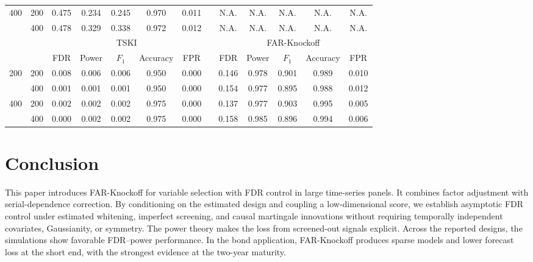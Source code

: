﻿\documentclass[12pt]{article}
\newcommand{\0}{\mbox{\bf 0}}
\theoremstyle{plain}%
\theoremstyle{definition}
\begin{document}
{\begin{table}[htbp]
{\begin{tabular}{ccccccccccccc}
		400   & 200   & 0.475  & 0.234  & 0.245  & 0.970  & 0.011  &       & N.A.  & N.A.  & N.A.  & N.A.  & N.A.  \\
		& 400   & 0.478  & 0.329  & 0.338  & 0.972  & 0.012  &       & N.A.  & N.A.  & N.A.  & N.A.  & N.A.  \\
		&       & \multicolumn{5}{c}{TSKI}              &       & \multicolumn{5}{c}{FAR-Knockoff} \\
		\cmidrule{3-7}\cmidrule{9-13}          &       & FDR & Power & $F_{1}$ & Accuracy & FPR   &       & FDR & Power & $F_{1}$ & Accuracy & FPR \\
		200   & 200   & 0.008  & 0.006  & 0.006  & 0.950  & 0.000  &       & 0.146 & 0.978 & 0.901 & 0.989 & 0.010 \\

		& 400   & 0.001  & 0.001  & 0.001  & 0.950  & 0.000  &       & 0.154 & 0.977 & 0.895 & 0.988 & 0.012 \\

		400   & 200   & 0.002  & 0.002  & 0.002  & 0.975  & 0.000  &       & 0.137 & 0.977 & 0.903 & 0.995 & 0.005 \\

		& 400   & 0.000  & 0.002  & 0.002  & 0.975  & 0.000  &       & 0.158 & 0.985 & 0.896 & 0.994 & 0.006 \\

		\bottomrule
	\end{tabular}}
\end{table}
\fi




\section{Conclusion}
\label{sec:conclusion}

{\color{minorrevisionred}
This paper introduces FAR-Knockoff for variable selection with FDR control in
large time-series panels. It combines factor adjustment with serial-dependence
correction. By conditioning on the estimated design and coupling a
low-dimensional score, we establish asymptotic FDR control under estimated
whitening, imperfect screening, and causal martingale innovations without
requiring temporally independent covariates, Gaussianity, or symmetry. The
power theory makes the loss from screened-out signals explicit. Across the
reported designs, the simulations show favorable FDR--power performance. In
the bond application, FAR-Knockoff produces sparse models and lower forecast
loss at the short end, with the strongest evidence at the two-year maturity.
}
  

}
\end{document}
